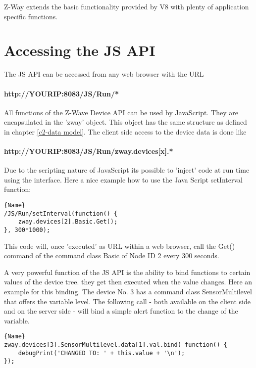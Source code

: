 Z-Way extends the basic functionality provided by V8 with plenty of application 
specific functions.

\section{Accessing the JS API}

The JS API can be accessed from any web browser with the URL

\paragraph{http://YOURIP:8083/JS/Run/*}

All functions of the Z-Wave Device API can be used by JavaScript. They are encapsulated
in the 'zway' object.  This object has the same structure as defined in chapter 
\ref{c2-data model}. 
The client side access to the device data is done like

\paragraph{http://YOURIP:8083/JS/Run/zway.devices[x].*}

Due to the scripting nature of JavaScript its possible to 'inject' code at run time
using the interface. Here a nice example how to use the Java Script 
setInterval function:

\begin{lstlisting}[caption=Polling device \#2]{Name}
/JS/Run/setInterval(function() { 
	zway.devices[2].Basic.Get();
}, 300*1000);
\end{lstlisting}

This code will, once 'executed' as URL within a web browser, call the Get() command
of the command class Basic of Node ID 2 every 300 seconds.  

A very powerful function of the JS API is the ability to bind functions to certain
values of the device tree. they get then executed when the value changes. Here an 
example for this binding. The device No. 3 has a command class SensorMultilevel that offers
the variable level. The following call - both available on the client side 
and on the server side - will bind a simple alert function to the change of 
the variable.

\begin{lstlisting}[caption=Bind a function]{Name}
zway.devices[3].SensorMultilevel.data[1].val.bind( function() { 
	debugPrint('CHANGED TO: ' + this.value + '\n'); 
});  
\end{lstlisting}

